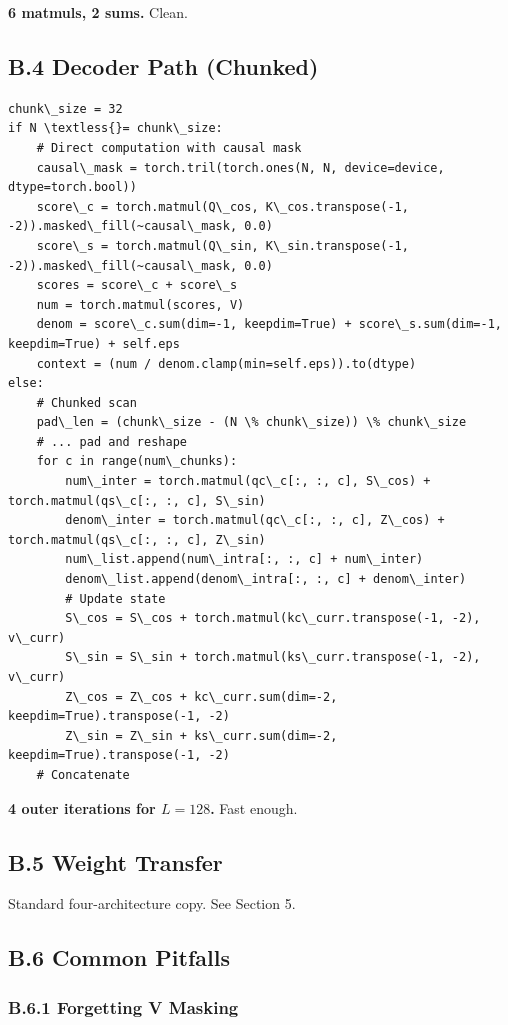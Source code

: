 \textbf{6 matmuls, 2 sums.} Clean.

\subsection{B.4 Decoder Path (Chunked)}

\begin{lstlisting}
chunk\_size = 32
if N \textless{}= chunk\_size:
    # Direct computation with causal mask
    causal\_mask = torch.tril(torch.ones(N, N, device=device, dtype=torch.bool))
    score\_c = torch.matmul(Q\_cos, K\_cos.transpose(-1, -2)).masked\_fill(~causal\_mask, 0.0)
    score\_s = torch.matmul(Q\_sin, K\_sin.transpose(-1, -2)).masked\_fill(~causal\_mask, 0.0)
    scores = score\_c + score\_s
    num = torch.matmul(scores, V)
    denom = score\_c.sum(dim=-1, keepdim=True) + score\_s.sum(dim=-1, keepdim=True) + self.eps
    context = (num / denom.clamp(min=self.eps)).to(dtype)
else:
    # Chunked scan
    pad\_len = (chunk\_size - (N \% chunk\_size)) \% chunk\_size
    # ... pad and reshape
    for c in range(num\_chunks):
        num\_inter = torch.matmul(qc\_c[:, :, c], S\_cos) + torch.matmul(qs\_c[:, :, c], S\_sin)
        denom\_inter = torch.matmul(qc\_c[:, :, c], Z\_cos) + torch.matmul(qs\_c[:, :, c], Z\_sin)
        num\_list.append(num\_intra[:, :, c] + num\_inter)
        denom\_list.append(denom\_intra[:, :, c] + denom\_inter)
        # Update state
        S\_cos = S\_cos + torch.matmul(kc\_curr.transpose(-1, -2), v\_curr)
        S\_sin = S\_sin + torch.matmul(ks\_curr.transpose(-1, -2), v\_curr)
        Z\_cos = Z\_cos + kc\_curr.sum(dim=-2, keepdim=True).transpose(-1, -2)
        Z\_sin = Z\_sin + ks\_curr.sum(dim=-2, keepdim=True).transpose(-1, -2)
    # Concatenate
\end{lstlisting}

\textbf{4 outer iterations for $L = 128$.} Fast enough.

\subsection{B.5 Weight Transfer}

Standard four-architecture copy. See Section 5.

\subsection{B.6 Common Pitfalls}

\subsubsection{B.6.1 Forgetting V Masking}

